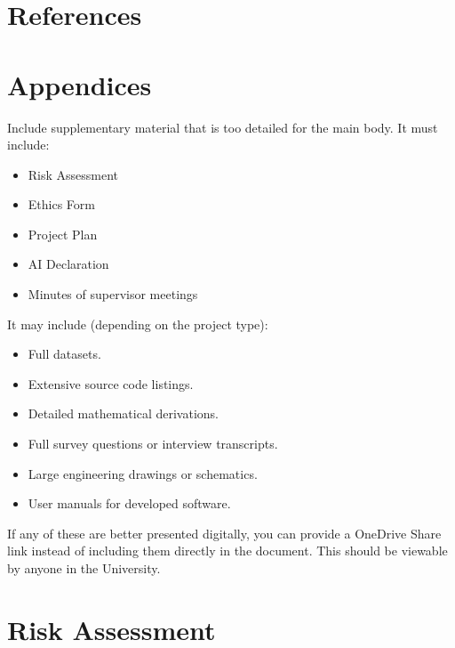 \documentclass[12pt,a4paper]{article}
\begin{document}
\newpage
\section*{References}
\printbibliography[heading=none]

\newpage
\begin{appendices}
    \section{Appendices}
    \label{sec:appendices}
    
Include supplementary material that is too detailed for the main body. It must include:
    
    \begin{itemize}
        \item Risk Assessment
        \item Ethics Form
        \item Project Plan
        \item AI Declaration
        \item Minutes of supervisor meetings
    \end{itemize}
    
It may include (depending on the project type):
    
    \begin{itemize}
        \item Full datasets.
        \item Extensive source code listings.
        \item Detailed mathematical derivations.
        \item Full survey questions or interview transcripts.
        \item Large engineering drawings or schematics.
        \item User manuals for developed software.
    \end{itemize}
    
If any of these are better presented digitally, you can provide a OneDrive Share link instead of including them directly in the document. This should be viewable by anyone in the University.
    
    \section{Risk Assessment}
    

\end{appendices}
\end{document}
